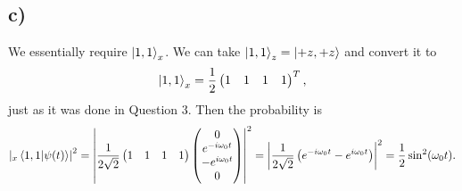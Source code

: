 \documentclass[12pt]{article}
\theoremstyle{definition}
\theoremstyle{definition}
\theoremstyle{definition}
\theoremstyle{definition}
\theoremstyle{definition}
\theoremstyle{example}
\theoremstyle{note}
\theoremstyle{remark}
\theoremstyle{example}
\begin{document}
 				\subsection*{c) }
 					We essentially require $\ket{1,1}_{x}$. We can take $\ket{1,1}_{z} = \ket{+z,+z}$ and convert it to 
 					$$\ket{1,1}_{x}  = \frac12 \begin{pmatrix}
 						1 & 1 & 1 & 1
 					\end{pmatrix}^{T},$$
 					just as it was done in Question $3$. Then the probability is 
 					$$ \abs{_{x}\braket{1,1}{\psi(t)}}^{2} = \abs{\frac{1}{2 \sqrt{2}} \begin{pmatrix}
 							1 & 1 & 1 & 1 
 						\end{pmatrix}\begin{pmatrix}
 						0 \\ e^{-i \omega_{0} t} \\ -e^{i \omega_{0}t} \\ 0
 				\end{pmatrix}}^{2} = \abs{\frac{1}{2 \sqrt{2}} \left(e^{-i \omega_{0}t} - e^{i \omega_{0} t}\right)}^{2} = \frac12 \sin^{2} (\omega_{0} t).$$
\end{document}
